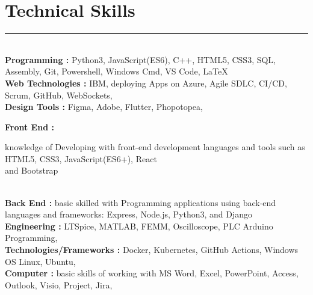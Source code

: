 \documentclass[12pt]{article}
\begin{document}
\vspace{-3mm}\section*{\fontsize{14}{1}\selectfont\color{color_29791}Technical Skills}\vspace{-9pt} 
\rule{\textwidth}{0.4pt}
\vspace{2pt}
\\{\fontsize{9}{1}\selectfont\color{color_29791}\hspace{5mm}\textbf{Programming :} Python3, JavaScript(ES6), C++, HTML5, CSS3, SQL, Assembly, Git, Powershell, Windows Cmd, VS Code, LaTeX}
\\{\fontsize{9}{1}\selectfont\color{color_29791}\hspace{5mm}\textbf{Web Technologies :} IBM, deploying Apps on Azure, Agile SDLC, CI/CD, Scrum, GitHub, WebSockets,}
\\{\fontsize{9}{1}\selectfont\color{color_29791}\hspace{5mm}\textbf{Design Tools :} Figma, Adobe, Flutter, Phopotopea,}
\\{\fontsize{9}{1}\selectfont\color{color_29791}\hspace{5mm}\textbf{Front End :} \parbox{\textwidth}{\raggedright knowledge of Developing with front-end development languages and tools such as HTML5, CSS3, JavaScript(ES6+), React \\ and Bootstrap}}
\\{\fontsize{9}{1}\selectfont\color{color_29791}\hspace{5mm}\textbf{Back End :} basic skilled with Programming applications using back-end languages and frameworks: Express, Node.js, Python3, and Django}
\\{\fontsize{9}{1}\selectfont\color{color_29791}\hspace{5mm}\textbf{Engineering :} LTSpice, MATLAB, FEMM, Oscilloscope, PLC Arduino Programming,}
\\{\fontsize{9}{1}\selectfont\color{color_29791}\hspace{5mm}\textbf{Technologies/Frameworks :} Docker, Kubernetes, GitHub Actions, Windows OS Linux, Ubuntu,}
\\{\fontsize{9}{1}\selectfont\color{color_29791}\hspace{5mm}\textbf{Computer :} basic skills of working with MS Word, Excel, PowerPoint, Access, Outlook, Visio, Project, Jira,}
\end{document}
